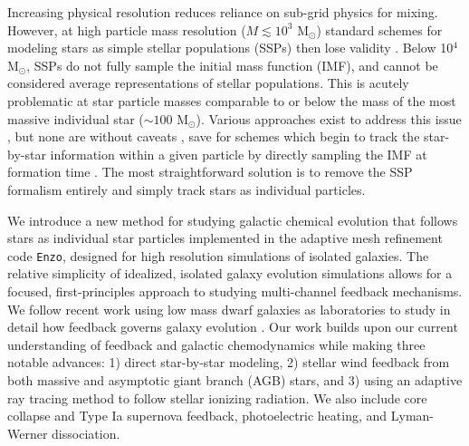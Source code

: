 \documentclass[twocolumn]{aastex61}
\begin{document}
Increasing physical resolution reduces reliance on sub-grid physics for mixing.  However, at high particle mass resolution ($M \lesssim 10^3$ M$_{\odot}$) standard schemes for modeling stars as simple stellar populations (SSPs) then lose validity  \citep[as studied in detail by][]{Revaz2016}. Below 10$^4$ M$_{\odot}$, SSPs do not fully sample the initial mass function (IMF), and cannot be considered average representations of stellar populations. This is acutely problematic at star particle masses comparable to or below the mass of the most massive individual star ($\sim 100$ M$_{\odot}$). Various approaches exist to address this issue \citep[e.g.][]{Kobayashi2000,WeidnerKroupa2004,Pflamm-AltenburgKroupa2006,RevazJablonka2012,Kroupa2013,Rosdahl2015,Su2017b}, but none are without caveats \citep{Revaz2016}, save for schemes which begin to track the star-by-star information within a given particle by directly sampling the IMF at formation time \citep[e.g.][]{Hu2017}.  The most straightforward
solution is to remove the SSP formalism entirely and simply track stars as individual particles. %
 
We introduce a new method for studying galactic chemical evolution that follows stars as individual star particles implemented in the adaptive mesh refinement code \texttt{Enzo}, designed for high resolution simulations of isolated galaxies. The relative simplicity of idealized, isolated galaxy evolution simulations allows for a focused, first-principles approach to studying multi-channel feedback mechanisms. We follow recent work using low mass dwarf galaxies as laboratories to study in detail how feedback governs galaxy evolution \citep{Forbes2016,Hu2016,Hu2017}.
Our work builds upon our current understanding of feedback and galactic chemodynamics while making three notable advances: 1) direct star-by-star modeling, 2) stellar wind feedback from both massive and asymptotic giant branch (AGB) stars, and 3) using an adaptive ray tracing method to follow stellar ionizing radiation. We also include core collapse and Type Ia supernova feedback, photoelectric heating, and Lyman-Werner dissociation. 
\end{document}
